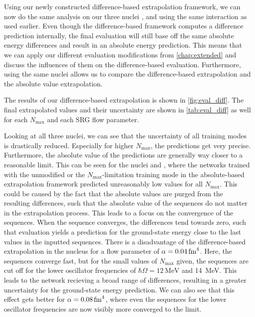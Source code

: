 Using our newly constructed difference-based extrapolation framework, we can now do the same analysis on our three nuclei ,  and  using the same interaction as used earlier. Even though the difference-based framework computes a difference prediction internally, the final evaluation will still base off the same absolute energy differences and result in an absolute energy prediction. This means that we can apply our different evaluation modifications from \autoref{chap:extended} and discuss the influences of them on the difference-based evaluation. Furthermore, using the same nuclei allows us to compare the difference-based extrapolation and the absolute value extrapolation.

The results of our difference-based extrapolation is shown in \autoref{fig:eval_diff}. The final extrapolated values and their uncertainty are shown in \autoref{tab:eval_diff} as well for each $N_\mathrm{max}$ and each SRG flow parameter.

Looking at all three nuclei, we can see that the uncertainty of all training modes is drastically reduced. Especially for higher $N_\mathrm{max}$, the predictions get very precise. Furthermore, the absolute value of the predictions are generally way closer to a reasonable limit. This can be seen for the nuclei  and , where the networks trained with the unmodified or the $N_\mathrm{max}$-limitation training mode in the absolute-based extrapolation framework predicted unreasonably low values for all $N_\mathrm{max}$. This could be caused by the fact that the absolute values are purged from the resulting differences, such that the absolute value of the sequences do not matter in the extrapolation process. This leads to a focus on the convergence of the sequences. When the sequence converges, the differences tend towards zero, such that evaluation yields a prediction for the ground-state energy close to the last values in the inputted sequences. There is a disadvantage of the difference-based extrapolation in the nucleus  for a flow parameter of $\alpha = \srg{0.04}$. Here, the sequences converge fast, but for the small values of $N_\mathrm{max}$ given, the sequences are cut off for the lower oscillator frequencies of $\hbar\Omega = \SI{12}{\mega\electronvolt}$ and \SI{14}{\mega\electronvolt}. This leads to the network recieving a broad range of differences, resulting in a greater uncertainty for the ground-state energy prediction. We can also see that this effect gets better for $\alpha = \srg{0.08}$, where even the sequences for the lower oscillator frequencies are now visibly more converged to the limit.

